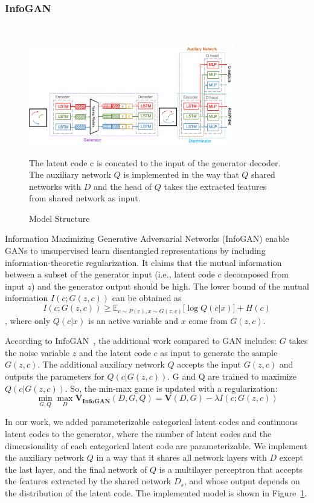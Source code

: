 \subsubsection{InfoGAN}
\hfill \\
\begin{figure}[ht]
  \centering
  \includegraphics[width=0.8\textwidth]{figures/arch.png}
  \caption{Model Structure}{The latent code c is concated to the input of the generator decoder. The auxiliary network $Q$ is implemented in the way that $Q$ shared networks with $D$ and the head of $Q$ takes the extracted features from shared network as input.}
  \label{arch}
\end{figure}
Information Maximizing Generative Adversarial Networks (InfoGAN) enable GANs to unsupervised learn disentangled representations by including information-theoretic regularization. It claims that the mutual information between a subset of the generator input (i.e., latent code $c$ decomposed from input $z$) and the generator output should be high. The lower bound of the mutual information $I(c; G(z, c))$ can be obtained as $$I(c; G(z, c)) \geq \mathbb{E}_{c \sim P(c), x \sim G(z, c)} \lbrack \log Q(c | x) \rbrack + H(c)$$, where only $Q(c | x)$ is an active variable and $x$ come from $G(z, c)$.

According to InfoGAN~\cite{infogan}, the additional work compared to GAN includes: $G$ takes the noise variable $z$ and the latent code $c$ as input to generate the sample $G(z, c)$. The additional auxiliary network $Q$ accepts the input $G(z, c)$ and outputs the parameters for $Q(c|G(z, c))$. G and Q are trained to maximize $Q(c | G(z, c))$. So, the min-max game is updated with a regularization: \[\min_{G,Q}\max_{D} \mathbf{V_{InfoGAN}}(D, G, Q) = \mathbf{V}(D, G) - \lambda I(c; G(z, c)) \]

In our work, we added parameterizable categorical latent codes and continuous latent codes to the generator, where the number of latent codes and the dimensionality of each categorical latent code are parameterizable. We implement the auxiliary network $Q$ in a way that it shares all network layers with $D$ except the last layer, and the final network of $Q$ is a multilayer perceptron that accepts the features extracted by the shared network $D_s$, and whose output depends on the distribution of the latent code. The implemented model is shown in Figure~\ref{arch}.



